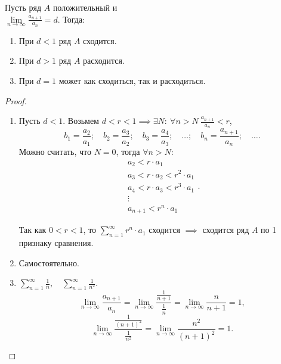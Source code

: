 \begin{theorem}
    Пусть ряд $A$ положительный и  \\ $ \underset{n\rightarrow\infty}{\lim}\frac{a_{n+1}}{a_n} = d $. Тогда:
    \begin{enumerate}
        \item При $d < 1$ ряд $A$ сходится.
        \item При $d > 1$ ряд $A$ расходится.
        \item При $d = 1$ может как сходиться, так и расходиться.
    \end{enumerate}
\end{theorem}

\begin{proof}\leavevmode
    \begin{enumerate}
        \item Пусть $d < 1$. Возьмем $d < r < 1 \implies \exists N: \ \forall n > N \ \frac{a_{n+1}}{a_n}<r $,
              \[
                  b_1 = \frac{a_2}{a_1}; \quad b_2 = \frac{a_3}{a_2}; \quad b_3 = \frac{a_4}{a_3}; \quad \ldots; \quad b_n = \frac{a_{n+1}}{a_n}; \quad \ldots.
              \]
              Можно считать, что $N=0$, тогда $\forall n > N$:
              \[
                  \begin{array}{l}
                      a_2 < r \cdot a_1                 \\
                      a_3 < r \cdot a_2 < r^2 \cdot a_1 \\
                      a_4 < r \cdot a_3 < r^3 \cdot a_1 \\
                      \vdots                            \\
                      a_{n+1} < r^n \cdot a_1
                  \end{array}.
              \]

              Так как $0 < r < 1$, то $\sum_{n=1}^{\infty} r^n \cdot a_1$ сходится $\implies$ сходится ряд $A$ по 1 признаку сравнения.
        \item Самостоятельно.
        \item $\sum_{n=1}^{\infty}\frac{1}{n}, \quad \sum_{n=1}^{\infty}\frac{1}{n^2}$.
              \[
                  \underset{n\rightarrow\infty}{\lim}\frac{a_{n+1}}{a_n} = \underset{n\rightarrow\infty}{\lim}\frac{\frac{1}{n+1}}{\frac{1}{n}} = \underset{n\rightarrow\infty}{\lim}\frac{n}{n+1} = 1,
              \]
              \[
                  \underset{n\rightarrow\infty}{\lim}\frac{\frac{1}{(n+1)^2}}{\frac{1}{n^2}} = \underset{n\rightarrow\infty}{\lim}\frac{n^2}{(n+1)^2} = 1.
              \]
    \end{enumerate}
\end{proof}